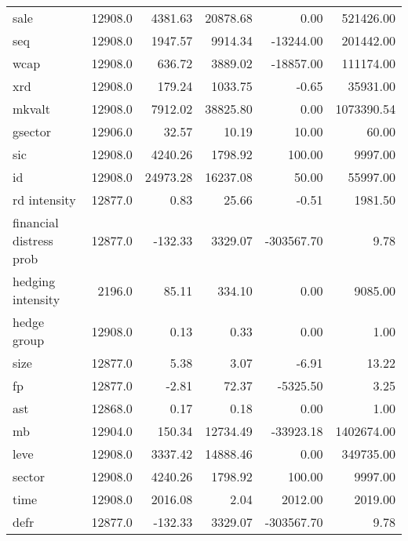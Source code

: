 \begin{tabular}{lrrrrr}
sale                    &  12908.0 &   4381.63 &  20878.68 &       0.00 &   521426.00 \\
seq                     &  12908.0 &   1947.57 &   9914.34 &  -13244.00 &   201442.00 \\
wcap                    &  12908.0 &    636.72 &   3889.02 &  -18857.00 &   111174.00 \\
xrd                     &  12908.0 &    179.24 &   1033.75 &      -0.65 &    35931.00 \\
mkvalt                  &  12908.0 &   7912.02 &  38825.80 &       0.00 &  1073390.54 \\
gsector                 &  12906.0 &     32.57 &     10.19 &      10.00 &       60.00 \\
sic                     &  12908.0 &   4240.26 &   1798.92 &     100.00 &     9997.00 \\
id                      &  12908.0 &  24973.28 &  16237.08 &      50.00 &    55997.00 \\
rd intensity            &  12877.0 &      0.83 &     25.66 &      -0.51 &     1981.50 \\
financial distress prob &  12877.0 &   -132.33 &   3329.07 & -303567.70 &        9.78 \\
hedging intensity       &   2196.0 &     85.11 &    334.10 &       0.00 &     9085.00 \\
hedge group             &  12908.0 &      0.13 &      0.33 &       0.00 &        1.00 \\
size                    &  12877.0 &      5.38 &      3.07 &      -6.91 &       13.22 \\
fp                      &  12877.0 &     -2.81 &     72.37 &   -5325.50 &        3.25 \\
ast                     &  12868.0 &      0.17 &      0.18 &       0.00 &        1.00 \\
mb                      &  12904.0 &    150.34 &  12734.49 &  -33923.18 &  1402674.00 \\
leve                    &  12908.0 &   3337.42 &  14888.46 &       0.00 &   349735.00 \\
sector                  &  12908.0 &   4240.26 &   1798.92 &     100.00 &     9997.00 \\
time                    &  12908.0 &   2016.08 &      2.04 &    2012.00 &     2019.00 \\
defr                    &  12877.0 &   -132.33 &   3329.07 & -303567.70 &        9.78 \\
\bottomrule
\end{tabular}
